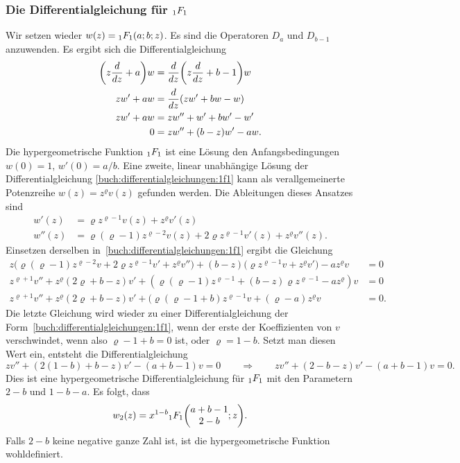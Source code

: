 \subsubsection{Die Differentialgleichung für $\mathstrut_1F_1$}
Wir setzen wieder $w(z) = \mathstrut_1F_1(a;b;z)$.
Es sind die Operatoren $D_a$ und $D_{b-1}$ anzuwenden.
Es ergibt sich die Differentialgleichung
\begin{align}
\biggl(z\frac{d}{dz}+a\biggr)w
&=
\frac{d}{dz}\biggl(z\frac{d}{dz} +b-1\biggr)w
\notag
\\
zw'+a w
&=
\frac{d}{dz}
(zw'+b w - w)
\notag
\\
zw'+a w
&=
zw'' +w'+b w' - w'
\notag
\\
0
&=
zw'' + (b - z)w' - a w.
\label{buch:differentialgleichungen:1f1}
\end{align}
Die hypergeometrische Funktion $\mathstrut_1F_1$ ist eine Lösung 
den Anfangsbedingungen $w(0)=1$, $w'(0)=a/b$.
Eine zweite, linear unabhängige Lösung der Differentialgleichung
\eqref{buch:differentialgleichungen:1f1} kann als verallgemeinerte
Potenzreihe $w(z) = z^\varrho v(z)$ gefunden werden.
Die Ableitungen dieses Ansatzes sind
\begin{align*}
w'(z) 
&=
\varrho z^{\varrho-1} v(z) + z^\varrho v'(z)
\\
w''(z)
&=
\varrho(\varrho-1) z^{\varrho-2} v(z)
+
2\varrho z^{\varrho-1} v'(z)
+
z^\varrho v''(z).
\end{align*}
Einsetzen derselben in~\eqref{buch:differentialgleichungen:1f1}
ergibt die Gleichung
\begin{align*}
z\bigl(
\varrho(\varrho-1)z^{\varrho-2}v + 2\varrho z^{\varrho-1}v'+z^\varrho v''
\bigr)
+
(b-z)\bigl(\varrho z^{\varrho-1}v+z^\varrho v'\bigr)
-
a z^\varrho v
&=
0
\\
z^{\varrho+1} v''
+
z^\varrho
(2\varrho + b-z)
v'
+
(\varrho(\varrho-1)z^{\varrho-1}
+(b-z)
\varrho
z^{\varrho-1}
-
az^\varrho
)
v
&=
0
\\
z^{\varrho+1} v''
+
z^\varrho(2\varrho+b-z)v'
+
(\varrho(\varrho-1+b) z^{\varrho-1} v
+
(\varrho-a)z^\varrho v
&=
0.
\end{align*}
Die letzte Gleichung wird wieder zu einer Differentialgleichung
der Form~\eqref{buch:differentialgleichungen:1f1}, wenn der erste
der Koeffizienten von $v$ verschwindet, wenn also 
$\varrho-1+b=0$ ist, oder $\varrho=1-b$.
Setzt man diesen Wert ein, entsteht die Differentialgleichung
\[
zv'' + (2(1-b)+b-z) v' - (a+b-1)v = 0
\qquad\Rightarrow\qquad
zv'' + (2-b-z) v' - (a+b-1)v = 0.
\]
Dies ist eine hypergeometrische Differentialgleichung für
$\mathstrut_1F_1$ mit den Parametern $2-b$ und $1-b-a$.
Es folgt, dass 
\[
w_2(z)
=
x^{1-b} \mathstrut_1F_1\biggl(
\begin{matrix}
a+b-1\\
2-b
\end{matrix}
;z
\biggr).
\]
Falls $2-b$ keine negative ganze Zahl ist, ist die hypergeometrische
Funktion wohldefiniert.

